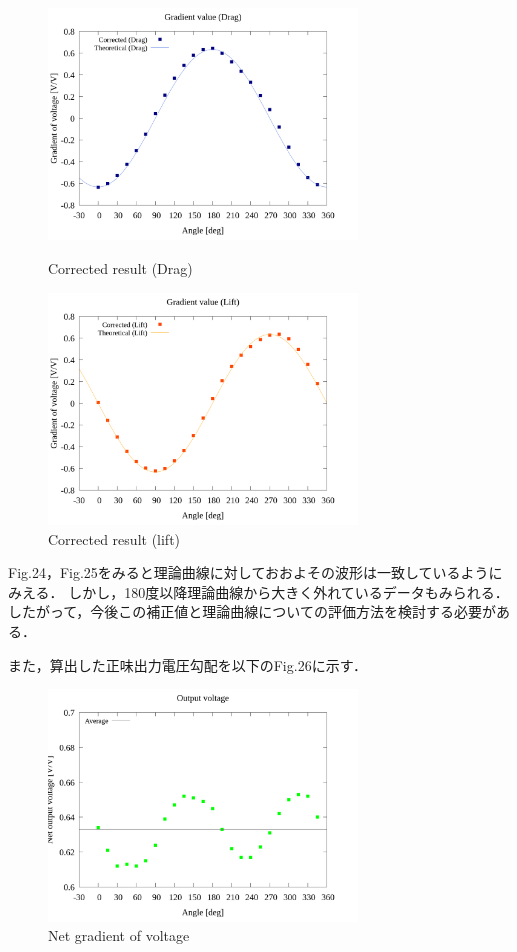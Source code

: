 \documentclass[twocolumn,a4j]{jsarticle}
\begin{document}
\begin{figure}[htbp]
    \begin{center}
    \includegraphics[width=82mm]{../../../02_workspace/result/2-ex/plot/21/21-4_corrected_angle_drag.png}
    \caption{Corrected result (Drag)}
    \includegraphics[width=82mm]{../../../02_workspace/result/2-ex/plot/21/21-4_corrected_angle_lift.png}
    \caption{Corrected result (lift)}
    \end{center}
\end{figure}

Fig.24，Fig.25をみると理論曲線に対しておおよその波形は一致しているようにみえる．
しかし，180度以降理論曲線から大きく外れているデータもみられる．
したがって，今後この補正値と理論曲線についての評価方法を検討する必要がある．

\newpage

また，算出した正味出力電圧勾配を以下のFig.26に示す．

\begin{figure}[htbp]
    \begin{center}
    \includegraphics[width=82mm]{../../../02_workspace/result/2-ex/plot/09/09_summary-outputvoltage-net.png}
    \caption{Net gradient of voltage}
    \end{center}
\end{figure}
\end{document}
